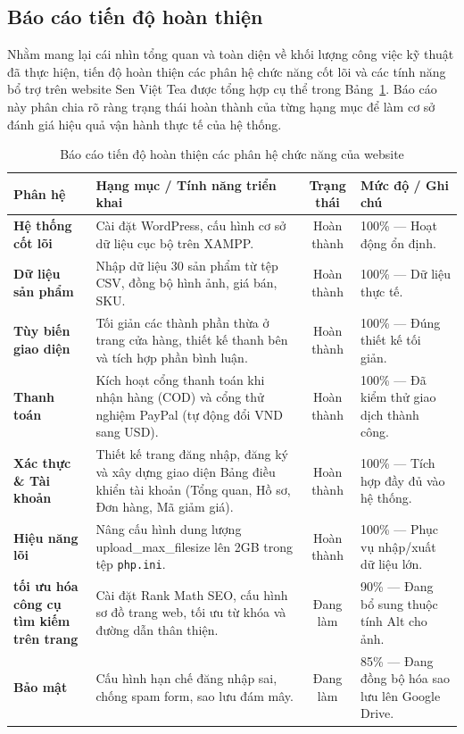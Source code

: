 \subsection{Báo cáo tiến độ hoàn thiện}

Nhằm mang lại cái nhìn tổng quan và toàn diện về khối lượng công việc kỹ thuật đã thực hiện, tiến độ hoàn thiện các phân hệ chức năng cốt lõi và các tính năng bổ trợ trên website Sen Việt Tea được tổng hợp cụ thể trong Bảng~\ref{tab:tien_do}. Báo cáo này phân chia rõ ràng trạng thái hoàn thành của từng hạng mục để làm cơ sở đánh giá hiệu quả vận hành thực tế của hệ thống.

\begin{table}[H]
    \centering
    \caption{Báo cáo tiến độ hoàn thiện các phân hệ chức năng của website}
    \label{tab:tien_do}
    \begin{tabular}{p{2.5cm} p{6.5cm} c p{4cm}}
        \toprule
        \textbf{Phân hệ} & \textbf{Hạng mục / Tính năng triển khai} & \textbf{Trạng thái} & \textbf{Mức độ / Ghi chú} \\
        \midrule
        \textbf{Hệ thống cốt lõi} & Cài đặt WordPress, cấu hình cơ sở dữ liệu cục bộ trên XAMPP. & Hoàn thành & 100\% --- Hoạt động ổn định. \\
        \textbf{Dữ liệu sản phẩm} & Nhập dữ liệu 30 sản phẩm từ tệp CSV, đồng bộ hình ảnh, giá bán, SKU. & Hoàn thành & 100\% --- Dữ liệu thực tế. \\
        \textbf{Tùy biến giao diện} & Tối giản các thành phần thừa ở trang cửa hàng, thiết kế thanh bên và tích hợp phần bình luận. & Hoàn thành & 100\% --- Đúng thiết kế tối giản. \\
        \textbf{Thanh toán} & Kích hoạt cổng thanh toán khi nhận hàng (COD) và cổng thử nghiệm PayPal (tự động đổi VND sang USD). & Hoàn thành & 100\% --- Đã kiểm thử giao dịch thành công. \\
        \textbf{Xác thực \& Tài khoản} & Thiết kế trang đăng nhập, đăng ký và xây dựng giao diện Bảng điều khiển tài khoản (Tổng quan, Hồ sơ, Đơn hàng, Mã giảm giá). & Hoàn thành & 100\% --- Tích hợp đầy đủ vào hệ thống. \\
        \textbf{Hiệu năng lõi} & Nâng cấu hình dung lượng upload\_max\_filesize lên 2GB trong tệp \texttt{php.ini}. & Hoàn thành & 100\% --- Phục vụ nhập/xuất dữ liệu lớn. \\
        \textbf{tối ưu hóa công cụ tìm kiếm trên trang} & Cài đặt Rank Math SEO, cấu hình sơ đồ trang web, tối ưu từ khóa và đường dẫn thân thiện. & Đang làm & 90\% --- Đang bổ sung thuộc tính Alt cho ảnh. \\
        \textbf{Bảo mật} & Cấu hình hạn chế đăng nhập sai, chống spam form, sao lưu đám mây. & Đang làm & 85\% --- Đang đồng bộ hóa sao lưu lên Google Drive. \\
        \bottomrule
    \end{tabular}
\\
\end{table}

